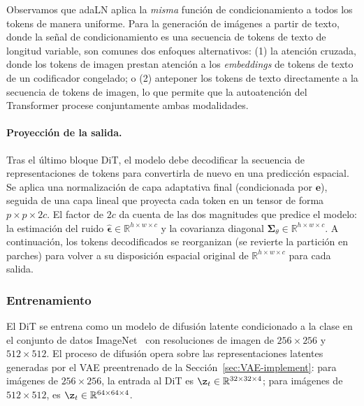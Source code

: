 \documentclass[../../book-main_es.tex]{subfiles}
\begin{document}
Observamos que adaLN aplica la \emph{misma} función de condicionamiento a todos los tokens 
de manera uniforme. Para la generación de imágenes a partir de texto, donde la señal de condicionamiento 
es una secuencia de tokens de texto de longitud variable, son comunes dos enfoques alternativos: 
(1) la atención cruzada, donde los tokens de imagen prestan atención a los \textit{embeddings} de 
tokens de texto de un codificador congelado; o (2) anteponer los tokens de texto directamente a 
la secuencia de tokens de imagen, lo que permite que la autoatención del Transformer procese 
conjuntamente ambas modalidades.

\paragraph{Proyección de la salida.}
Tras el último bloque DiT, el modelo debe decodificar la secuencia de representaciones de 
tokens para convertirla de nuevo en una predicción espacial. Se aplica una normalización de 
capa adaptativa final (condicionada por $\boldsymbol{e}$), seguida de una capa lineal que 
proyecta cada token en un tensor de forma $p \times p \times 2c$. El factor de $2c$ da 
cuenta de las dos magnitudes que predice el modelo: la estimación del ruido 
$\hat{\boldsymbol{\epsilon}} \in \mathbb{R}^{h \times w \times c}$ y la covarianza diagonal 
$\boldsymbol{\Sigma}_\theta \in \mathbb{R}^{h \times w \times c}$. A continuación, los tokens 
decodificados se reorganizan (se revierte la partición en parches) para volver a su disposición 
espacial original de $\mathbb{R}^{h \times w \times c}$ para cada salida.

\subsubsection{Entrenamiento}
El DiT se entrena como un modelo de difusión latente condicionado a la clase en el conjunto 
de datos ImageNet~\citep{deng2009imagenet} con resoluciones de imagen de $256 \times 256$ y 
$512 \times 512$. El proceso de difusión opera sobre las representaciones latentes generadas 
por el VAE preentrenado de la Sección~\ref{sec:VAE-implement}: para imágenes de 
$256 \times 256$, la entrada al DiT es $\z_t \in \mathbb{R}^{32 \times 32 \times 4}$; para 
imágenes de $512 \times 512$, es $\z_t \in \mathbb{R}^{64 \times 64 \times 4}$.
\end{document}
